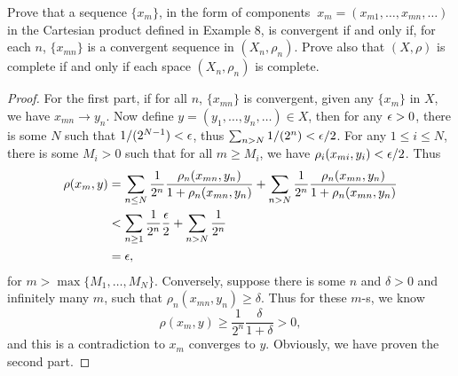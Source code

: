 \begin{pro}%
	Prove that a sequence $\{x_m\}$, in the form of components $~x_m=(x_{m1},\dots,x_{mn},\dots)$ in the Cartesian product defined in Example $8$, is convergent if and only if, for each $n$, $\{x_{mn}\}$ is a convergent sequence in $(X_n,\rho_n)$. Prove also that $(X,\rho)$ is complete if and only if each space $(X_n,\rho_n)$ is complete.
\end{pro}
\begin{proof}
	For the first part, if for all $n$, $\{x_{mn}\}$ is convergent, given any $\{x_m\}$ in $X$, we have $x_{mn}\to y_n$. Now define $y=(y_1,\dots,y_n,\dots)\in X$, then for any $\epsilon>0$, there is some $N$ such that $1/(2^{N-1})<\epsilon$, thus $\sum_{n>N} 1/(2^n)<\epsilon/2$. For any $1\leq i\leq N$, there is some $M_i>0$ such that for all $m\geq M_i$, we have $\rho_i(x_{mi},y_i)<\epsilon/2$. Thus
	\begin{align*}
		\rho(x_m,y)&=\sum_{n\leq N}\frac{1}{2^n}\frac{\rho_{n}(x_{mn},y_n)}{1+\rho_n(x_{mn},y_n)}+
		\sum_{n> N}\frac{1}{2^n}\frac{\rho_{n}(x_{mn},y_n)}{1+\rho_n(x_{mn},y_n)}\\
		&< \sum_{n\geq 1} \frac{1}{2^n}\frac{\epsilon}{2}+\sum_{n>N} \frac{1}{2^n}\\
		&= \epsilon,
	\end{align*}
	for $m>\max\{M_1,\dots,M_{N}\}$. 
	Conversely, suppose there is some $n$ and $\delta>0$ and infinitely many $m$, such that $\rho_n(x_{mn},y_n)\geq \delta$. Thus for these $m$-s, we know
	\[\rho(x_m,y)\geq \frac{1}{2^n}\frac{\delta}{1+\delta}>0,\]
	and this is a contradiction to $x_m$ converges to $y$. Obviously, we have proven the second part.
\end{proof}

